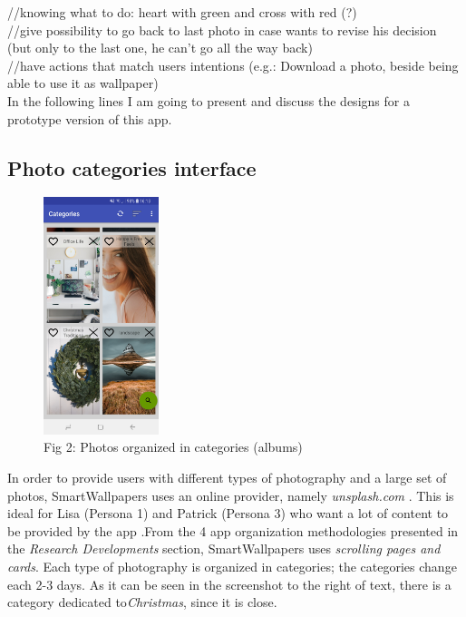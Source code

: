 \documentclass[version=last,fontsize=13pt]{scrartcl}
\begin{document}
//knowing what to do: heart with green and cross with red (?)\\

//give possibility to go back to last photo in case wants to revise his decision (but only to the last one, he can't go all the way back)\\

//have actions that match users intentions (e.g.: Download a photo, beside being able to use it as wallpaper)\\


	In the  following lines I am going to present and discuss the designs for a prototype version of this app.

\subsection{Photo categories interface}
\begin{figure}

	\centering
	\includegraphics[width = 0.3\textwidth]{imgs/Categories.jpg}
	\caption*{Fig 2: Photos organized in categories (albums)}

\end{figure}
	In order to provide  users with different types of photography and a large set of photos, SmartWallpapers uses an online provider, namely \textit{unsplash.com} .
This is ideal for Lisa (Persona 1) and Patrick (Persona 3) who want a lot of content to be provided by the app .From the 4 app organization methodologies presented in the \textit{Research Developments} section, SmartWallpapers uses \textit{scrolling pages and cards}. Each type of photography is organized in categories; the categories change each 2-3 days. As it can be seen in the screenshot to the right of text, there is a category dedicated to\textit{Christmas}, since it is close. \\
\end{document}

